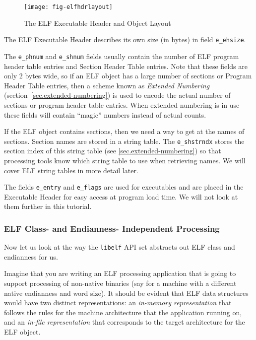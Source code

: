 \documentclass[a4paper]{report}
\makeatletter
\newcommand{\firstterm}[1]{\textit{#1}}                 %
\newcommand{\library}[1]{\texttt{#1}}
\newcommand{\parameter}[1]{\texttt{#1}}
\newenvironment{callout}[2][blue]{%
  \begingroup\newcommand{\@cocolor}{#1}%
  \newcommand{\@cogroup}[1]{#2}}{\endgroup}
\newcommand{\@co}[1]{\framebox{\textbf{\color{\@cocolor}#1}}}
\newcommand{\coref}[1]{%
  \hypertarget{\@cogroup.#1.cr}{%
    \hyperlink{\@cogroup.#1.co}{\@co{#1}}}}
\makeatother
\begin{document}
\begin{callout}{ehdr}
\begin{description}
    \begin{figure}[H]
      \caption{The ELF Executable Header and Object Layout}
      \label{fig.elf.ehdr-layout}
      \begin{center}
        \texttt{[image: fig-elfhdrlayout]}
      \end{center}
    \end{figure}

    The ELF Executable Header describes its own size (in bytes) in
    field \parameter{e\_ehsize}.

    \item[\coref{6} \coref{7}] The \parameter{e\_phnum} and
      \parameter{e\_shnum} fields usually contain the number of ELF
      program header table entries and Section Header Table entries.
      Note that these fields are only 2 bytes wide, so if an ELF
      object has a large number of sections or Program Header Table
      entries, then a scheme known as \firstterm{Extended Numbering}
      (section~\vref{sec.extended-numbering}) is used to encode the
      actual number of sections or program header table entries.  When
      extended numbering is in use these fields will contain ``magic''
      numbers instead of actual counts.

    \item[\coref{8}] If the ELF object contains sections, then we need
      a way to get at the names of sections.  Section names are stored
      in a string table. The \parameter{e\_shstrndx} stores the
      section index of this string table (see
      \vref{sec.extended-numbering}) so that processing tools know
      which string table to use when retrieving names.  We will cover
      ELF string tables in more detail later.
  \end{description}

  The fields \parameter{e\_entry} and \parameter{e\_flags} are used
  for executables and are placed in the Executable Header for easy
  access at program load time.  We will not look at them further in
  this tutorial.
\end{callout}

\subsubsection{ELF Class- and Endianness- Independent Processing}
Now let us look at the way the \library{libelf} API set abstracts out
ELF class and endianness for us.

Imagine that you are writing an ELF processing application that is
going to support processing of non-native binaries (say for a machine
with a different native endianness and word size).  It should be
evident that ELF data structures would have two distinct
representations: an \firstterm{in-memory representation} that follows
the rules for the machine architecture that the application running
on, and an \firstterm{in-file representation} that corresponds to the
target architecture for the ELF object.
\end{document}
